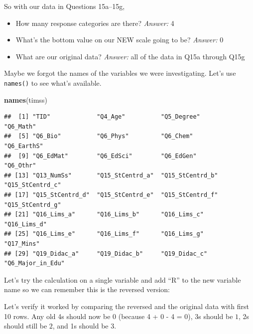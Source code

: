 \documentclass[
]{article}
\newenvironment{Shaded}{\begin{snugshade}}{\end{snugshade}}
\newcommand{\DecValTok}[1]{\textcolor[rgb]{0.00,0.00,0.81}{#1}}
\newcommand{\KeywordTok}[1]{\textcolor[rgb]{0.13,0.29,0.53}{\textbf{#1}}}
\newcommand{\NormalTok}[1]{#1}
\newcommand{\OperatorTok}[1]{\textcolor[rgb]{0.81,0.36,0.00}{\textbf{#1}}}
\newcommand{\StringTok}[1]{\textcolor[rgb]{0.31,0.60,0.02}{#1}}
\providecommand{\tightlist}{%
  \setlength{\itemsep}{0pt}\setlength{\parskip}{0pt}}
\begin{document}
So with our data in Questions 15a--15g,

\begin{itemize}
\tightlist
\item
  How many response categories are there? \emph{Answer:} 4
\item
  What's the bottom value on our NEW scale going to be? \emph{Answer:} 0
\item
  What are our original data? \emph{Answer:} all of the data in Q15a through Q15g
\end{itemize}

Maybe we forgot the names of the variables we were investigating. Let's use \texttt{names()} to see what's available.

\begin{Shaded}
\begin{Highlighting}[]
\KeywordTok{names}\NormalTok{(timss) }
\end{Highlighting}
\end{Shaded}

\begin{verbatim}
##  [1] "TID"             "Q4_Age"          "Q5_Degree"       "Q6_Math"        
##  [5] "Q6_Bio"          "Q6_Phys"         "Q6_Chem"         "Q6_EarthS"      
##  [9] "Q6_EdMat"        "Q6_EdSci"        "Q6_EdGen"        "Q6_Othr"        
## [13] "Q13_NumSs"       "Q15_StCentrd_a"  "Q15_StCentrd_b"  "Q15_StCentrd_c" 
## [17] "Q15_StCentrd_d"  "Q15_StCentrd_e"  "Q15_StCentrd_f"  "Q15_StCentrd_g" 
## [21] "Q16_Lims_a"      "Q16_Lims_b"      "Q16_Lims_c"      "Q16_Lims_d"     
## [25] "Q16_Lims_e"      "Q16_Lims_f"      "Q16_Lims_g"      "Q17_Mins"       
## [29] "Q19_Didac_a"     "Q19_Didac_b"     "Q19_Didac_c"     "Q6_Major_in_Edu"
\end{verbatim}

Let's try the calculation on a single variable and add ``R'' to the new variable name so we can remember this is the reversed version:

\begin{Shaded}
\end{Shaded}

Let's verify it worked by comparing the reversed and the original data with first 10 rows.
Any old 4s should now be \(0\) (because 4 + 0 - 4 = 0), 3s should be \(1\), 2s should still be \(2\), and 1s should be \(3\).
\end{document}
